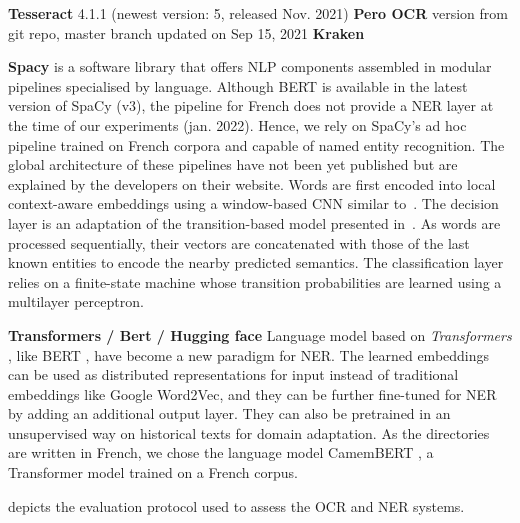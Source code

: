 \textbf{Tesseract} 4.1.1 (newest version: 5, released Nov. 2021)
\textbf{Pero OCR} version from git repo, master branch updated on Sep 15, 2021
\textbf{Kraken}

\textbf{Spacy} is a software library that offers NLP components assembled in modular pipelines specialised by language.
Although BERT is available in the latest version of SpaCy (v3), the pipeline for French does not provide a NER layer at the time of our experiments (jan. 2022).
Hence, we rely on SpaCy's ad hoc pipeline trained on French corpora and capable of named entity recognition.
The global architecture of these pipelines have not been yet published but are explained by the developers on their website.
Words are first encoded into local context-aware embeddings using a window-based CNN similar to~\cite{collobert2011}.
The decision layer is an adaptation of the transition-based model presented in~\cite{lample2016}.
As words are processed sequentially, their vectors are concatenated with those of the last known entities to encode the nearby predicted semantics.
The classification layer relies on a finite-state machine whose transition probabilities are learned using a multilayer perceptron.



\textbf{Transformers / Bert / Hugging face}
Language model based on \textit{Transformers} \cite{vaswani2017attention}, like BERT \cite{devlin2018bert}, have become a new paradigm for NER\cite{li2020}. 
The learned embeddings can be used as distributed representations for input instead of traditional embeddings like Google Word2Vec, and they can be further fine-tuned for NER by adding an additional output layer. 
They can also be pretrained in an unsupervised way on historical texts for domain adaptation.
As the directories are written in French, we chose the language model CamemBERT \cite{martin-etal-2020-camembert}, a Transformer model trained on a French corpus.

 depicts the evaluation protocol used to assess the OCR and NER systems. 



